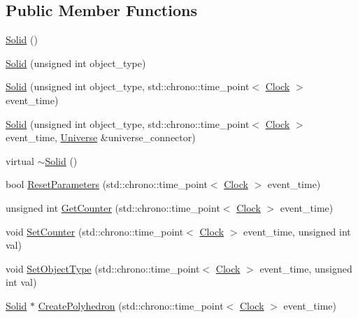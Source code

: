 \subsection*{Public Member Functions}
\begin{DoxyCompactItemize}
\item 
\mbox{\hyperlink{classSolid_a2cf157c87df66dc3eb8722f9b3ee8f66}{Solid}} ()
\item 
\mbox{\hyperlink{classSolid_a00a71dfc929ca50ee9850bdfca5b3fd6}{Solid}} (unsigned int object\+\_\+type)
\item 
\mbox{\hyperlink{classSolid_a9f5476b751c749af38b349b9fc7e2ba5}{Solid}} (unsigned int object\+\_\+type, std\+::chrono\+::time\+\_\+point$<$ \mbox{\hyperlink{universe_8h_a0ef8d951d1ca5ab3cfaf7ab4c7a6fd80}{Clock}} $>$ event\+\_\+time)
\item 
\mbox{\hyperlink{classSolid_a80746ad255dded6090e648fc3f0dbd93}{Solid}} (unsigned int object\+\_\+type, std\+::chrono\+::time\+\_\+point$<$ \mbox{\hyperlink{universe_8h_a0ef8d951d1ca5ab3cfaf7ab4c7a6fd80}{Clock}} $>$ event\+\_\+time, \mbox{\hyperlink{classUniverse}{Universe}} \&universe\+\_\+connector)
\item 
virtual \mbox{\hyperlink{classSolid_a07095e0808c0ef6b206bc70992ef557d}{$\sim$\+Solid}} ()
\item 
bool \mbox{\hyperlink{classSolid_ac43dc78fa7f6a3348fc99751ff6bbc52}{Reset\+Parameters}} (std\+::chrono\+::time\+\_\+point$<$ \mbox{\hyperlink{universe_8h_a0ef8d951d1ca5ab3cfaf7ab4c7a6fd80}{Clock}} $>$ event\+\_\+time)
\item 
unsigned int \mbox{\hyperlink{classSolid_a7ca41431033d05957f8be3f49c3aca23}{Get\+Counter}} (std\+::chrono\+::time\+\_\+point$<$ \mbox{\hyperlink{universe_8h_a0ef8d951d1ca5ab3cfaf7ab4c7a6fd80}{Clock}} $>$ event\+\_\+time)
\item 
void \mbox{\hyperlink{classSolid_aea949040518e505ed39b1456a360c5e0}{Set\+Counter}} (std\+::chrono\+::time\+\_\+point$<$ \mbox{\hyperlink{universe_8h_a0ef8d951d1ca5ab3cfaf7ab4c7a6fd80}{Clock}} $>$ event\+\_\+time, unsigned int val)
\item 
void \mbox{\hyperlink{classSolid_af6fe46af0be9a9533e114b1c0f186bfc}{Set\+Object\+Type}} (std\+::chrono\+::time\+\_\+point$<$ \mbox{\hyperlink{universe_8h_a0ef8d951d1ca5ab3cfaf7ab4c7a6fd80}{Clock}} $>$ event\+\_\+time, unsigned int val)
\item 
\mbox{\hyperlink{classSolid}{Solid}} $\ast$ \mbox{\hyperlink{classSolid_a231b2c469aab60b092fcc3a9525e5c80}{Create\+Polyhedron}} (std\+::chrono\+::time\+\_\+point$<$ \mbox{\hyperlink{universe_8h_a0ef8d951d1ca5ab3cfaf7ab4c7a6fd80}{Clock}} $>$ event\+\_\+time)

\end{DoxyCompactItemize}
